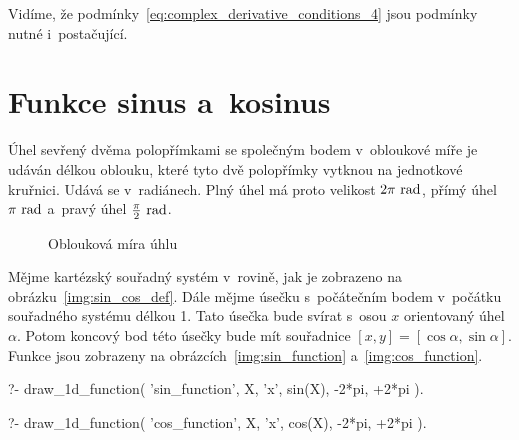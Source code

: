Vidíme, že podmínky~\eqref{eq:complex_derivative_conditions_4} jsou podmínky nutné i~postačující.

\section{Funkce sinus a~kosinus}

Úhel sevřený dvěma polopřímkami se společným bodem v~obloukové míře je udáván délkou oblouku, které tyto dvě polopřímky vytknou na jednotkové kruřnici. Udává se v~radiánech. Plný úhel má proto velikost \(2 \pi \ \mathrm{rad}\), přímý úhel \(\pi \ \mathrm{rad}\) a~pravý úhel \(\frac{\pi}{2} \ \mathrm{rad}\).

\begin{figure}[ht]
\begin{center}
\caption{Oblouková míra úhlu}
\end{center}
\label{img:rad_def}
\end{figure}

Mějme kartézský souřadný systém v~rovině, jak je zobrazeno na obrázku~\ref{img:sin_cos_def}. Dále mějme úsečku s~počátečním bodem v~počátku souřadného systému délkou 1. Tato úsečka bude svírat s~osou \(x\) orientovaný úhel \(\alpha\). Potom koncový bod této úsečky bude mít souřadnice \([x, y] = [\cos \alpha, \sin \alpha]\). Funkce jsou zobrazeny na obrázcích~\ref{img:sin_function} a~\ref{img:cos_function}.

\begin{prolog}
?-	draw_1d_function(
		'sin_function',
		X,
		'x',
		sin(X),
		-2*pi, +2*pi
	).				
\end{prolog}

\begin{prolog}
?-	draw_1d_function(
		'cos_function',
		X,
		'x',
		cos(X),
		-2*pi, +2*pi
	).				
\end{prolog}

